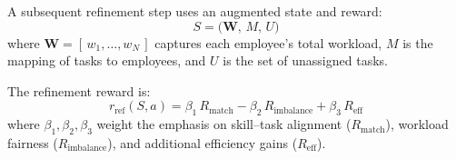 \documentclass[%
aip,
cp,  %
reprint
]{revtex4-2}
\begin{document}
	A subsequent refinement step uses an augmented state and reward:
	\begin{equation}
		S = \bigl(\mathbf{W},\, M,\, U\bigr)
	\end{equation}
	where $\mathbf{W}=[\,w_{1},\dots,w_{N}\,]$ captures each employee's total workload, $M$ is the mapping of tasks to employees, and $U$ is the set of unassigned tasks.
	
	The refinement reward is:
	\begin{equation}
		r_{\text{ref}}(S,a) = \beta_{1}\,R_{\text{match}}-\beta_{2}\,R_{\text{imbalance}}+\beta_{3}\,R_{\text{eff}}
	\end{equation}
	where $\beta_{1},\beta_{2},\beta_{3}$ weight the emphasis on skill--task alignment ($R_{\text{match}}$), workload fairness ($R_{\text{imbalance}}$), and additional efficiency gains ($R_{\text{eff}}$).
	
\end{document}
